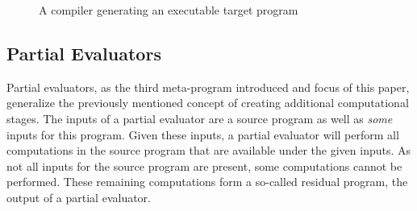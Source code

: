 \begin{figure}
  \centering
  \caption{A compiler generating an executable target program}\label{fig:compiled-program}
\end{figure}



\subsection{Partial Evaluators}

Partial evaluators, as the third meta-program introduced and focus of this paper, generalize the previously mentioned concept of creating additional computational stages.
The inputs of a partial evaluator are a source program as well as \textit{some} inputs for this program.
Given these inputs, a partial evaluator will perform all computations in the source program that are available under the given inputs.
As not all inputs for the source program are present, some computations cannot be performed.
These remaining computations form a so-called residual program, the output of a partial evaluator.

